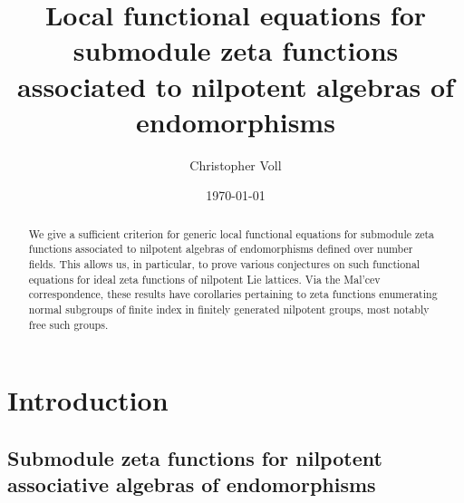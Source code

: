 \documentclass[11pt]{amsart}
\numberwithin{equation}{section}
\numberwithin{figure}{section}
\theoremstyle{plain}
\theoremstyle{definition}
\theoremstyle{remark}
\begin{document}
\title[Local functional equations for submodule zeta functions]{Local
  functional equations for submodule zeta functions associated to
  nilpotent algebras of endomorphisms}

\date{\today} \author{Christopher Voll} \address{Fakult\"at f\"ur
  Mathematik, Universit\"at Bielefeld\\ Postfach 100131\\ D-33501
  Bielefeld\\Germany} 


\begin{abstract} 

  We give a sufficient criterion for generic local functional
  equations for submodule zeta functions associated to nilpotent
  algebras of endomorphisms defined over number fields. This allows
  us, in particular, to prove various conjectures on such functional
  equations for ideal zeta functions of nilpotent Lie lattices. Via
  the Mal'cev correspondence, these results have corollaries
  pertaining to zeta functions enumerating normal subgroups of finite
  index in finitely generated nilpotent groups, most notably free such
  groups.

\end{abstract}
\maketitle

\thispagestyle{empty}
\section{Introduction}

\subsection{Submodule zeta functions for nilpotent associative
  algebras of endomorphisms} 
\end{document}

